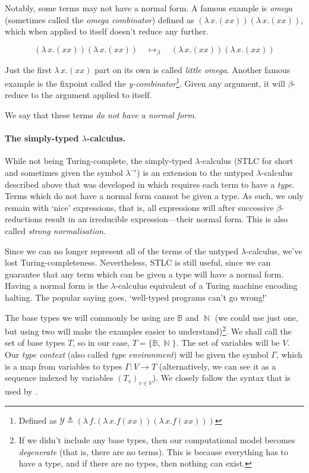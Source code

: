 \documentclass[logo,bsc,singlespacing,parskip,online]{infthesis}
\DeclareMathOperator{\nat}{\mathbb{N}}
\begin{document}
Notably, some terms may not have a normal form. A famous example is
\textit{omega} (sometimes called the \textit{omega combinator}) defined as
$(\lambda \, x. (x x)) (\lambda \, x. (x x))$, which when applied to itself
doesn't reduce any further.

\begin{equation*}
  (\lambda \, x. (x x)) (\lambda \, x. (x x)) \quad \mapsto_{\beta} \quad (\lambda \, x. (x x)) (\lambda \, x. (x x))
\end{equation*}

Just the first $\lambda \, x. (x x)$ part on its own is called \textit{little
omega}. Another famous example is the fixpoint called the
\textit{y-combinator}\footnote{Defined as $\mathcal{Y} \triangleq (\lambda \, f.
(\lambda \, x. f (x x )) (\lambda \, x. f (xx)))$}. Given any argument, it will
$\beta$-reduce to the argument applied to itself.

We say that these terms \textit{do not have a normal form}.

\paragraph*{The simply-typed $\lambda$-calculus.} While not being
Turing-complete, the simply-typed $\lambda$-calculus (STLC for short and
sometimes given the symbol $\lambda^{\rightarrow}$) is an extension to the
untyped $\lambda$-calculus described above that was developed in
\citet{church_formulation_1940} which requires each term to have a
\textit{type}. Terms which do not have a normal form cannot be given a type. As
such, we only remain with `nice' expressions, that is, all expressions will
after successive $\beta$-reductions result in an irreducible expression---their
normal form. This is also called \textit{strong normalisation}.
\citep{pierce_types_2002}

Since we can no longer represent all of the terms of the untyped
$\lambda$-calculus, we've lost Turing-completeness. Nevertheless, STLC is still
useful, since we can guarantee that any term which can be given a type will have
a normal form. Having a normal form is the $\lambda$-calculus equivalent of a
Turing machine encoding halting. The popular saying goes, `well-typed programs
can't go wrong!' \citep{milner_theory_1978}

The base types we will commonly be using are $\mathbb{B}$ and $\nat$ (we could
use just one, but using two will make the examples easier to
understand)\footnote{If we didn't include any base types, then our computational
model becomes \textit{degenerate} (that is, there are no terms). This is because
everything has to have a type, and if there are no types, then nothing can
exist.}. We shall call the set of base types $T$, so in our case, $T = \{
\mathbb{B} , \nat \}$. The set of variables will be $V$. Our \textit{type
context} (also called \textit{type environment}) will be given the symbol
$\Gamma$, which is a map from variables to types $\Gamma \colon V \to T$
(alternatively, we can see it as a sequence indexed by variables $(T_v)_{v \in
V}$). We closely follow the syntax that is used by \citet{pierce_types_2002}.
\end{document}
